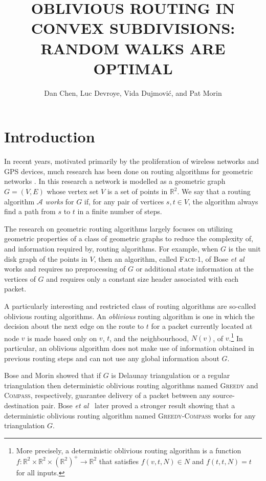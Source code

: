 \documentclass [letterpaper] {patmorin}
\title{\MakeUppercase{Oblivious Routing in Convex Subdivisions: \newline 
       Random Walks are Optimal}}
\author{Dan Chen, Luc Devroye, Vida Dujmovi\'c, and Pat Morin}
\newcommand{\R}{\mathbb{R}}
\newcommand{\etal}{\emph{et al}}
\begin{document}
\maketitle

\section{Introduction}
\label{sec:intro}

In recent years, motivated primarily by the proliferation of wireless networks and GPS devices, much research has been done on routing algorithms for geometric networks \cite{gior03}.  In this research a network is modelled as a geometric graph $G=(V,E)$ whose vertex set $V$ is a set of points in $\R^2$. We say that a routing algorithm $\mathcal{A}$ \emph{works} for $G$ if, for any pair of vertices $s,t\in V$, the algorithm always find a path from $s$ to $t$ in a finite number of steps.

The research on geometric routing algorithms largely focuses on utilizing geometric properties of a class of geometric graphs to reduce the complexity of, and information required by, routing algorithms.  For example, when $G$ is the unit disk graph of the points in $V$, then an algorithm, called \textsc{Face-1}, of Bose \etal\ \cite{bose01} works and requires no preprocessing of $G$ or additional state information at the vertices of $G$ and requires only a constant size header associated with each packet.

A particularly interesting and restricted class of routing algorithms are so-called oblivious routing algorithms.  An \emph{oblivious} routing algorithm is one in which the decision about the next edge on the route to $t$ for a packet currently located at node $v$ is made based only on $v$, $t$, and the neighbourhood, $N(v)$, of $v$.\footnote{More precisely, a deterministic oblivious routing algorithm is a function $f:\R^2\times\R^2\times(\R^2)^+\rightarrow \R^2$ that satisfies $f(v,t,N) \in N$ and $f(t,t,N) = t$ for all inputs.}  In particular, an oblivious algorithm does not make use of information obtained in previous routing steps and can not use any global information about $G$.

Bose and Morin \cite{bose04} showed that if $G$ is Delaunay triangulation or a regular triangulation then deterministic oblivious routing algorithms named \textsc{Greedy} and \textsc{Compass}, respectively, guarantee delivery of a packet between any source-destination pair.  Bose \etal\ \cite{bose02} later proved a stronger result showing that a deterministic oblivious routing algorithm named \textsc{Greedy-Compass} works for any triangulation $G$.
\end{document}
